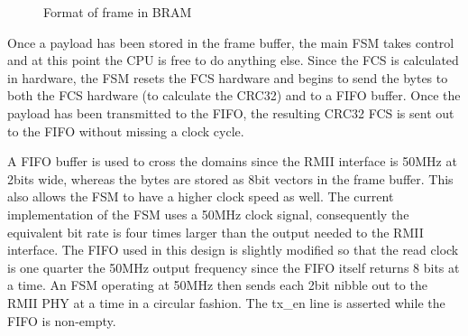 \begin{figure}[h!]
    \centering
    \caption{Format of frame in BRAM}
    \label{fig:bram_frame_format}
\end{figure}


Once a payload has been stored in the frame buffer, the main FSM takes control and at this point the CPU is free to do anything else. Since the FCS is calculated in hardware, the FSM resets the FCS hardware and begins to send the bytes to both the FCS hardware (to calculate the CRC32) and to a FIFO buffer. Once the payload has been transmitted to the FIFO, the resulting CRC32 FCS is sent out to the FIFO without missing a clock cycle. 

A FIFO buffer is used to cross the domains since the RMII interface is 50MHz at 2bits wide, whereas the bytes are stored as 8bit vectors in the frame buffer. This also allows the FSM to have a higher clock speed as well. The current implementation of the FSM uses a 50MHz clock signal, consequently the equivalent bit rate is four times larger than the output needed to the RMII interface. The FIFO used in this design is slightly modified so that the read clock is one quarter the 50MHz output frequency since the FIFO itself returns 8 bits at a time. An FSM operating at 50MHz then sends each 2bit nibble out to the RMII PHY at a time in a circular fashion. The tx\_en line is asserted while the FIFO is non-empty.


